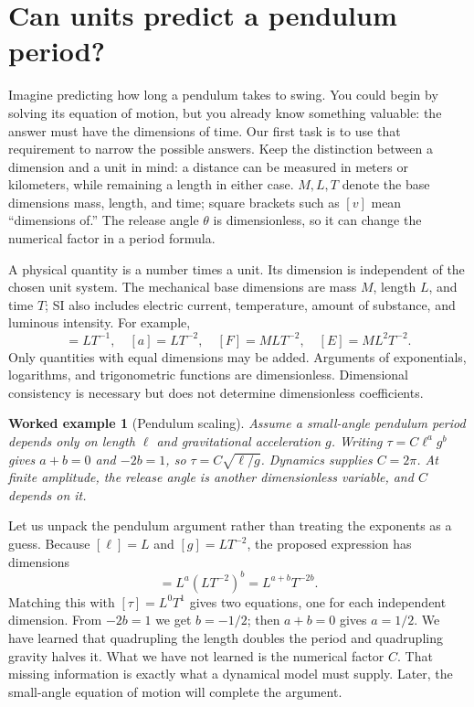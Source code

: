 \documentclass[11pt,oneside]{book}
\theoremstyle{reviewstyle}
\newtheorem{example}{Worked example}[chapter]
\begin{document}
\section{Can units predict a pendulum period?}
Imagine predicting how long a pendulum takes to swing. You could begin by solving its equation of motion, but you already know something valuable: the answer must have the dimensions of time. Our first task is to use that requirement to narrow the possible answers. Keep the distinction between a dimension and a unit in mind: a distance can be measured in meters or kilometers, while remaining a length in either case. $M,L,T$ denote the base dimensions mass, length, and time; square brackets such as $[v]$ mean ``dimensions of.'' The release angle $\theta$ is dimensionless, so it can change the numerical factor in a period formula.

A physical quantity is a number times a unit. Its dimension is independent of the chosen unit system. The mechanical base dimensions are mass $M$, length $L$, and time $T$; SI also includes electric current, temperature, amount of substance, and luminous intensity. For example,
\begin{equation}
[v]=LT^{-1},\quad [a]=LT^{-2},\quad [F]=MLT^{-2},\quad [E]=ML^2T^{-2}.
\end{equation}
Only quantities with equal dimensions may be added. Arguments of exponentials, logarithms, and trigonometric functions are dimensionless. Dimensional consistency is necessary but does not determine dimensionless coefficients.

\begin{example}[Pendulum scaling]
Assume a small-angle pendulum period depends only on length $\ell$ and gravitational acceleration $g$. Writing $\tau=C\ell^ag^b$ gives $a+b=0$ and $-2b=1$, so $\tau=C\sqrt{\ell/g}$. Dynamics supplies $C=2\pi$. At finite amplitude, the release angle is another dimensionless variable, and $C$ depends on it.
\end{example}

Let us unpack the pendulum argument rather than treating the exponents as a guess. Because $[\ell]=L$ and $[g]=LT^{-2}$, the proposed expression has dimensions
\begin{equation}
[\ell^ag^b]=L^a(LT^{-2})^b=L^{a+b}T^{-2b}.
\end{equation}
Matching this with $[\tau]=L^0T^1$ gives two equations, one for each independent dimension. From $-2b=1$ we get $b=-1/2$; then $a+b=0$ gives $a=1/2$. We have learned that quadrupling the length doubles the period and quadrupling gravity halves it. What we have not learned is the numerical factor $C$. That missing information is exactly what a dynamical model must supply. Later, the small-angle equation of motion will complete the argument.
\end{document}
